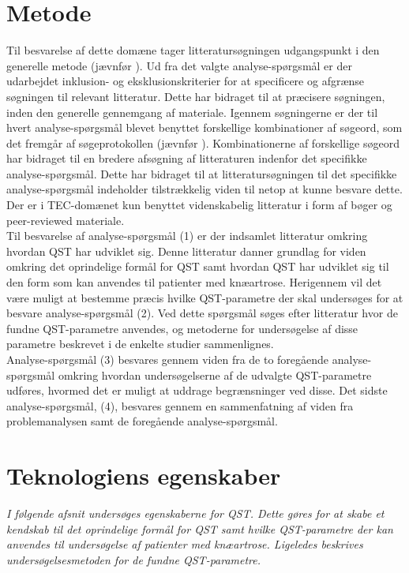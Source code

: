 \section{Metode}
Til besvarelse af dette domæne tager litteratursøgningen  udgangspunkt i den generelle metode (jævnfør ). Ud fra det valgte analyse-spørgsmål er der udarbejdet inklusion- og eksklusionskriterier for at specificere og afgrænse søgningen til relevant litteratur. Dette har bidraget til at præcisere søgningen, inden den generelle gennemgang af materiale. Igennem søgningerne er der til hvert analyse-spørgsmål blevet benyttet forskellige kombinationer af søgeord, som det fremgår af søgeprotokollen (jævnfør ). Kombinationerne af forskellige søgeord har bidraget til en bredere afsøgning af litteraturen indenfor det specifikke analyse-spørgsmål. Dette har bidraget til at litteratursøgningen til det specifikke analyse-spørgsmål indeholder tilstrækkelig viden til netop at kunne besvare dette. Der er i TEC-domænet kun benyttet videnskabelig litteratur i form af bøger og peer-reviewed materiale. \\
Til besvarelse af analyse-spørgsmål (1) er der indsamlet litteratur omkring hvordan QST har udviklet sig. Denne litteratur danner grundlag for viden omkring det oprindelige formål for QST samt hvordan QST har udviklet sig til den form som kan anvendes til patienter med knæartrose. Herigennem vil det være muligt at bestemme præcis hvilke QST-parametre der skal undersøges for at besvare analyse-spørgsmål (2). Ved dette spørgsmål søges efter litteratur hvor de fundne QST-parametre anvendes, og metoderne for undersøgelse af disse parametre beskrevet i de enkelte studier sammenlignes. \\
Analyse-spørgsmål (3) besvares gennem viden fra de to foregående analyse-spørgsmål omkring hvordan undersøgelserne af de udvalgte QST-parametre udføres, hvormed det er muligt at uddrage begrænsninger ved disse. Det sidste analyse-spørgsmål, (4), besvares gennem en sammenfatning af viden fra problemanalysen samt de foregående analyse-spørgsmål.   
 
\section{Teknologiens egenskaber}
\textit{I følgende afsnit undersøges egenskaberne for QST. Dette gøres for at skabe et kendskab til det oprindelige formål for QST samt hvilke QST-parametre der kan anvendes til undersøgelse af patienter med knæartrose. Ligeledes beskrives undersøgelsesmetoden for de fundne QST-parametre.}

